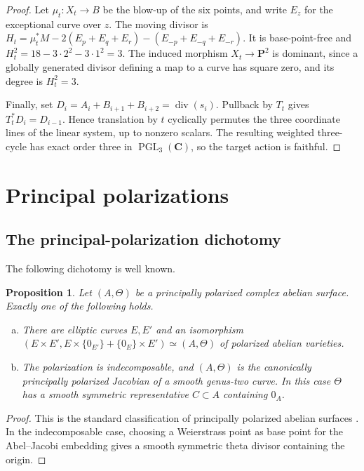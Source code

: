 \documentclass[12pt]{amsart}
\numberwithin{equation}{section}
\newtheorem{proposition}[theorem]{Proposition}
\theoremstyle{definition}
\theoremstyle{remark}
\newcommand{\C}{\mathbf C}
\newcommand{\PP}{\mathbf P}
\newcommand{\divisor}{\operatorname{div}}
\begin{document}
\begin{proof}
Let $\mu_t:X_t\to B$ be the blow-up of the six points, and write $E_z$
for the exceptional curve over $z$.  The moving divisor is
$H_t=\mu_t^*M-2(E_p+E_q+E_r)
-(E_{-p}+E_{-q}+E_{-r})$.  It is base-point-free and
$H_t^2=18-3\cdot2^2-3\cdot1^2=3$.
The induced morphism $X_t\to\PP^2$ is dominant, since a globally generated
divisor defining a map to a curve has square zero, and its degree is
$H_t^2=3$.

Finally, set $D_i=A_i+B_{i+1}+B_{i+2}=\divisor(s_i)$.
Pullback by $T_t$ gives $T_t^*D_i=D_{i-1}$.  Hence translation by $t$
cyclically permutes the three coordinate lines of the linear system, up to nonzero
scalars.  The resulting weighted three-cycle has exact order three in
$\operatorname{PGL}_3(\C)$, so the target action is faithful.
\end{proof}

\section{Principal polarizations}\label{sec:11}

\subsection{The principal-polarization dichotomy}

The following dichotomy is well known.

\begin{proposition}\label{prop:ppas-dichotomy}
Let $(A,\Theta)$ be a principally polarized complex abelian surface.
Exactly one of the following holds.
\begin{enumerate}[(a)]
\item There are elliptic curves $E,E'$ and an isomorphism
      $(E\times E',E\times\{0_{E'}\}+\{0_E\}\times E')
      \simeq(A,\Theta)$ of polarized abelian varieties.
\item The polarization is indecomposable, and $(A,\Theta)$ is the
      canonically principally polarized Jacobian of a smooth genus-two
      curve.  In this case $\Theta$ has a smooth symmetric representative
      $C\subset A$ containing $0_A$.
\end{enumerate}
\end{proposition}

\begin{proof}
This is the standard classification of principally polarized abelian
surfaces \cite[Corollary~11.8.2(a)]{BL}.  In the indecomposable case, choosing
a Weierstrass point as base point for the Abel--Jacobi embedding gives a
smooth symmetric theta divisor containing the origin.
\end{proof}
\end{document}
